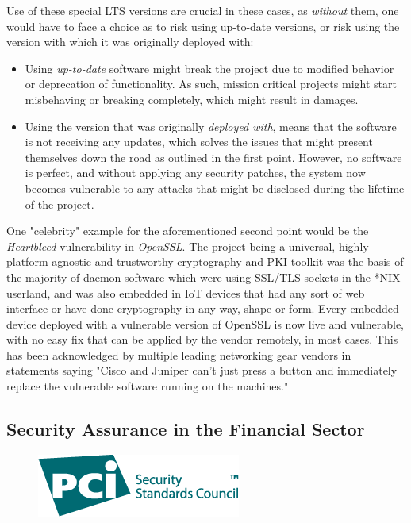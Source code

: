 \documentclass[a4paper,12pt]{article}
\begin{document}
	Use of these special LTS versions are crucial in these cases, as \textit{without} them, one would have to face a choice as to risk using up-to-date versions, or risk using the version with which it was originally deployed with:
	
	\vspace{-0.15in}
	\begin{itemize}
		\item Using \textit{up-to-date} software might break the project due to modified behavior or deprecation of functionality. As such, mission critical projects might start misbehaving or breaking completely, which might result in damages.
		\item Using the version that was originally \textit{deployed with}, means that the software is not receiving any updates, which solves the issues that might present themselves down the road as outlined in the first point. However, no software is perfect, and without applying any security patches, the system now becomes vulnerable to any attacks that might be disclosed during the lifetime of the project.
	\end{itemize}
	\vspace{-0.15in}
	
	One "celebrity" example for the aforementioned second point would be the \textit{Heartbleed} vulnerability in \textit{OpenSSL}. The project being a universal, highly platform-agnostic and trustworthy cryptography and PKI toolkit was the basis of the majority of daemon software which were using SSL/TLS sockets in the *NIX userland, and was also embedded in IoT devices that had any sort of web interface or have done cryptography in any way, shape or form. Every embedded device deployed with a vulnerable version of OpenSSL is now live and vulnerable, with no easy fix that can be applied by the vendor remotely, in most cases. This has been acknowledged by multiple leading networking gear vendors in statements saying "Cisco and Juniper can't just press a button and immediately replace the vulnerable software running on the machines."\cite{jpaglier14}
	
\subsection{Security Assurance in the Financial Sector}

	\begin{figure}
		\vspace{-11pt}
		\centering
		\includegraphics[scale=0.5]{pci.png}
	\end{figure}
\end{document}
